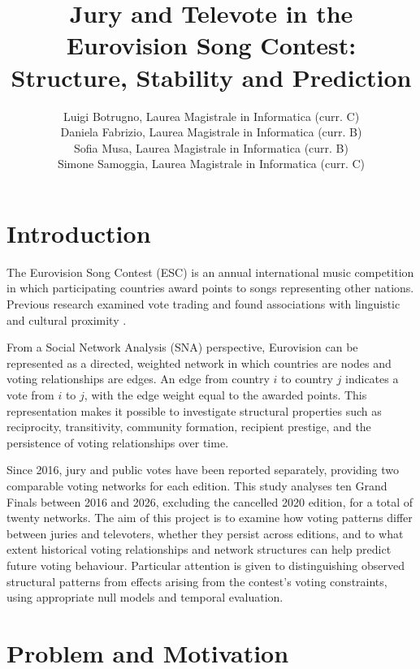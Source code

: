 \documentclass[12pt,a4paper]{article}
\title{
Jury and Televote in the Eurovision Song Contest:\\
Structure, Stability and Prediction
}
\author{
Luigi Botrugno, Laurea Magistrale in Informatica
(curr. C)\matricola{Botrugno}\\
Daniela Fabrizio, Laurea Magistrale in Informatica
(curr. B)\matricola{Fabrizio}\\
Sofia Musa, Laurea Magistrale in Informatica
(curr. B)\matricola{Musa}\\
Simone Samoggia, Laurea Magistrale in Informatica
(curr. C)\matricola{Samoggia}
}
\date{}
\begin{document}
\maketitle


\section{Introduction}
\label{introduction}


The Eurovision Song Contest (ESC) is an annual international
music competition in which participating countries award
points to songs representing other nations. Previous research examined
vote trading and found associations with linguistic and cultural
proximity \cite{ginsburgh2008}.

From a Social Network Analysis (SNA) perspective,
Eurovision can be represented as a directed, weighted
network in which countries are nodes and voting
relationships are edges. An edge from country $i$ to
country $j$ indicates a vote from $i$ to $j$, with
the edge weight equal to the awarded points.
This representation makes it possible to investigate
structural properties such as reciprocity, transitivity,
community formation, recipient prestige, and the persistence
of voting relationships over time.

Since 2016, jury and public votes have been reported
separately, providing two comparable voting networks
for each edition. This study analyses ten Grand Finals
between 2016 and 2026, excluding the cancelled 2020
edition, for a total of twenty networks. The aim of this project is to examine how voting
patterns differ between juries and televoters, whether
they persist across editions, and to what extent
historical voting relationships and network structures
can help predict future voting behaviour. Particular
attention is given to distinguishing observed structural
patterns from effects arising from the contest's voting
constraints, using appropriate null models and
temporal evaluation.




\section{Problem and Motivation}
\label{problem-and-motivation}
\end{document}
